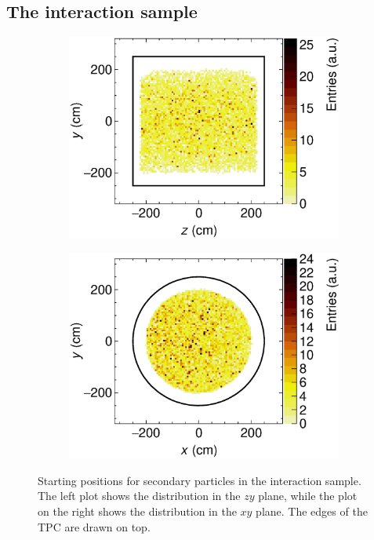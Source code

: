 \subsection{The interaction sample}
\label{sec:interactionGAr}

\begin{figure}[t]
     \centering
     \begin{subfigure}[b]{0.48\textwidth}
         \centering
         \includegraphics[width=\textwidth]{figures/ch5-KF_NDGAr/FullSample/Int/Props/YZ_view.eps}
         \caption{}
         \label{fig:YZViewGArInt}
     \end{subfigure}
     \begin{subfigure}[b]{0.48\textwidth}
         \centering
         \includegraphics[width=\textwidth]{figures/ch5-KF_NDGAr/FullSample/Int/Props/XY_view.eps}
         \caption{}
         \label{fig:XYViewGAr_Int}
     \end{subfigure}
        \caption[Starting positions for secondary particles in the interaction sample.]{Starting positions for secondary particles in the interaction sample. The left plot shows the distribution in the $zy$ plane, while the plot on the right shows the distribution in the $xy$ plane. The edges of the TPC are drawn on top. } \label{fig:ViewGArInt}
\end{figure}

